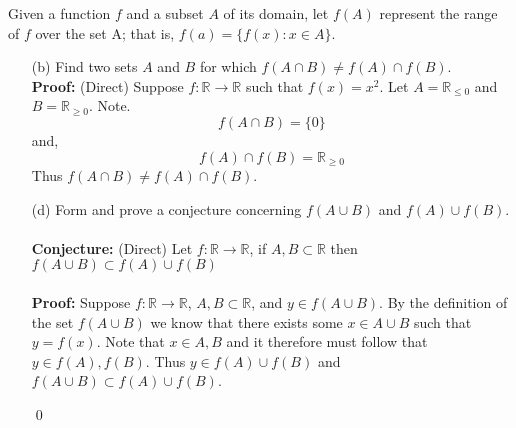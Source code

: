 \documentclass[12pt]{article}
\makeatletter
\theoremstyle{homework}
\newenvironment{exercise}[1]
{\def\@currentlabel{#1}\exercisecore}
{\endexercisecore}
\newcommand{\Reals}{\ensuremath{\mathbb R}}
\let\RR\Reals
\makeatother
\begin{document}
\begin{exercise}{1.2.7(b), (d)}
Given a function $f$ and a subset $A$ of its domain, let $f(A)$ represent the range of $f$ over the set A;
that is, $f(a)=\{f(x):x\in A\}$.
\end{exercise}
\begin{enumerate}
\item[(b)] Find two sets $A$ and $B$ for which $f(A\cap B) \neq f(A)\cap f(B)$.
\\
\textbf{Proof:} (Direct) Suppose $f: \RR \to \RR$ such that $f(x) = x^2$. Let $A = \RR_{\leq 0}$ and $B = \RR_{\geq 0}$. Note.
\begin{equation*}
  f(A \cap B) = \{0\}
\end{equation*}
 and,
 \begin{equation*}
  f(A)\cap f(B) =  \RR_{\geq 0}
 \end{equation*}
 Thus  $f(A\cap B) \neq f(A)\cap f(B)$.

\item[(d)] Form and prove a conjecture concerning $f(A\cup B)$ and $f(A)\cup f(B)$.\\\\
 
\textbf{Conjecture:} (Direct) Let $f: \RR \to \RR$, if $A,B \subset \RR$ then $f(A\cup B) \subset f(A)\cup f(B)$\\\\
\textbf{Proof:} Suppose  $f: \RR \to \RR$, $A,B \subset \RR$, and $y \in f(A\cup B)$. By the definition of the set $f(A\cup B)$
we know that there exists some $x \in A\cup B$ such that $y = f(x)$. Note that $x \in A,B$ and it therefore must follow that $y \in f(A),f(B)$.
Thus $y \in  f(A)\cup f(B) $ and $f(A\cup B) \subset f(A)\cup f(B)$.

\qed
\end{enumerate}
\end{document}
